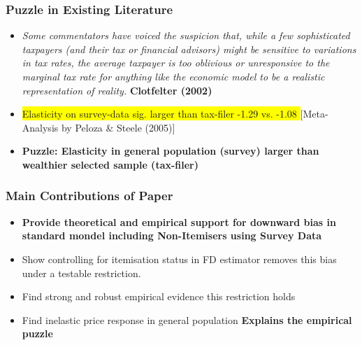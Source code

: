 \documentclass[options]{beamer}
\begin{document}
		

	\begin{frame}
		\frametitle{Puzzle in Existing Literature}
		\begin{itemize}

		
		
		\item[]\small  \textit{Some commentators have voiced the suspicion that, while a
		few sophisticated taxpayers (and their tax or financial advisors)
		might be sensitive to variations in tax rates, the average taxpayer
		is too oblivious or unresponsive to the marginal tax rate for anything
		like the economic model to be a realistic representation of reality.}
\textbf{	Clotfelter (2002)}
		
		\vspace{10pt}
		\small

			\vspace{10pt}
				\item[]
				\colorbox{yellow}{Elasticity on survey-data sig. larger than tax-filer -1.29 vs. -1.08 } 
				[Meta-Analysis by Peloza \& Steele (2005)]
				\vspace{25pt}
				\item[] \textbf{Puzzle: Elasticity in general population (survey) larger than  wealthier selected sample  (tax-filer)}
		\end{itemize}
		
	\end{frame}



	
	\begin{frame}
		\frametitle{Main Contributions of Paper}
			\begin{itemize}
				
		\item[] \textbf{Provide  theoretical and  empirical   support for  downward bias in standard mondel including Non-Itemisers using Survey Data}
			\vspace{15pt}
			
	\item[] Show controlling for itemisation status in FD estimator removes this bias under a testable restriction.
		\vspace{15pt}
	\item[]  Find strong and robust empirical evidence  this restriction holds
		\vspace{15pt}
		
		
		\item[] Find inelastic price response in general population \textbf{Explains the empirical puzzle {\tiny }}
	 

 \end{itemize}
 
\end{frame}
\end{document}
